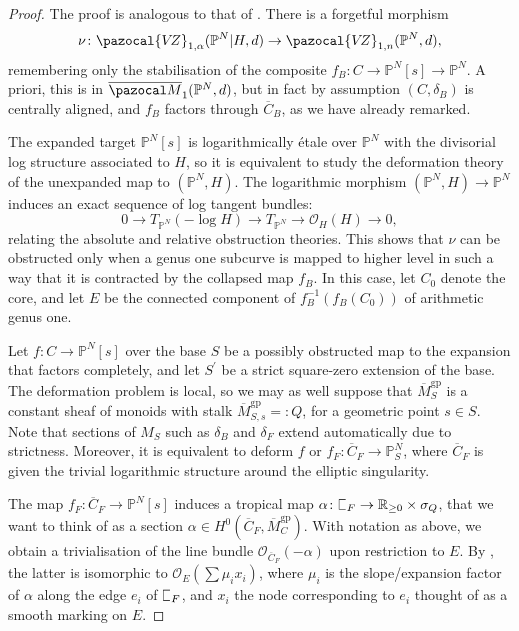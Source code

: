 \documentclass[11pt]{amsart}
\newcommand{\plC}{\scalebox{0.8}[1.3]{$\sqsubset$}}
\newcommand{\PP}{\mathbb P}
\newcommand{\VZ}{\pazocal{V\!Z}}
\newcommand{\OO}{\mathcal{O}}
\renewcommand{\to}{\rightarrow}
\newcommand{\RR}{\mathbb{R}}
\theoremstyle{definition}
\theoremstyle{definition}
\begin{document}
\begin{proof}
The proof is analogous to that of \cite[Theorem 3.5.1]{RSPW2}. There is a forgetful morphism
\[
\nu\colon \VZ_{1,\alpha}(\mathbb P^N|H,d)\to \VZ_{1,n}(\mathbb P^N,d),
\]
remembering only the stabilisation of the composite $f_B\colon C\to\PP^N[s]\to\PP^N$. A priori, this is in $\overline{\pazocal M}_1(\PP^N,d)$, but in fact by assumption $(C,\delta_B)$ is centrally aligned, and $f_B$ factors through $\overline C_B$, as we have already remarked.

The expanded target $\PP^N[s]$ is logarithmically \'etale over $\PP^N$ with the divisorial log structure associated to $H$, so it is equivalent to study the deformation theory of the unexpanded map to $(\PP^N,H)$. The logarithmic morphism $(\PP^N,H)\to \PP^N$ induces an exact sequence of log tangent bundles:
\[0\to T_{\PP^N}(-\operatorname{log}H)\to T_{\PP^N}\to\OO_H(H)\to 0,\]
relating the absolute and relative obstruction theories. This shows that $\nu$ can be obstructed only when a genus one subcurve is mapped to higher level in such a way that it is contracted by the collapsed map $f_B$. In this case, let $C_0$ denote the core, and let $E$ be the connected component of $f_B^{-1}(f_B(C_0))$ of arithmetic genus one.

Let $f\colon C\to\PP^N[s]$ over the base $S$ be a possibly obstructed map to the expansion that factors completely, and let $S^\prime$ be a strict square-zero extension of the base.  The deformation problem is local, so we may as well suppose that $\overline M_S^{\text{gp}}$ is a constant sheaf of monoids with stalk $\overline M_{S,s}^{\text{gp}}=:Q$, for a geometric point $s\in S$. Note that sections of $M_S$ such as $\delta_B$ and $\delta_F$ extend automatically due to strictness. Moreover, it is equivalent to deform $f$ or $f_F\colon\overline C_F\to\PP^N_S$, where $\overline C_F$ is given the trivial logarithmic structure around the elliptic singularity.

The map $f_F\colon \overline C_F\to\PP^N[s]$ induces a tropical map $\alpha\colon\plC_F\to\RR_{\geq 0}\times\sigma_Q$, that we want to think of as a section $\alpha\in H^0(\overline C_F,\overline M_C^{\text{gp}})$. With notation as above, we obtain a trivialisation of the line bundle $\OO_{\overline C_F}(-\alpha)$ upon restriction to $E$. By \cite[Proposition 2.4.1]{RSPW}, the latter is isomorphic to $\OO_E(\sum\mu_i x_i)$, where $\mu_i$ is the slope/expansion factor of $\alpha$ along the edge $e_i$ of $\plC_F$, and $x_i$ the node corresponding to $e_i$ thought of as a smooth marking on $E$. 


\end{proof}
\end{document}

